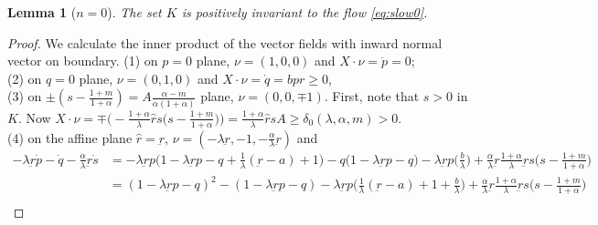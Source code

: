 \documentclass[a4paper,11pt]{article}
\newtheorem{lemma}{Lemma}[section]
\begin{document}
{%
\begin{lemma}[$n=0$] 
The set $K$ is positively invariant to the flow \eqref{eq:slow0}. \label{l:posK0}
\end{lemma}
\begin{proof}
 We calculate the inner product of the vector fields with inward normal vector on boundary.
 (1) on $p=0$ plane, $\nu = (1,0,0)$ and $X\cdot\nu = \dot{p}=0$;\\
 (2) on $q=0$ plane, $\nu = (0,1,0)$ and $X\cdot\nu=\dot{q} = bpr\ge0$,\\
 (3) on $\pm\left(s-\frac{1+m}{1+\alpha}\right) = A \frac{\alpha-m}{\alpha(1+\alpha)}$ plane, $\nu = (0,0,\mp1)$. First, note that $s>0$ in $K$. Now $X\cdot\nu = \mp\Big(-\frac{1+\alpha}{\lambda}\hat{r}s\big(s- \frac{1+m}{1+\alpha}\big)\Big) = \frac{1+\alpha}{\lambda}\hat{r}sA \ge \delta_0(\lambda,\alpha,m)>0$.\\%
 (4) on the affine plane $\hat{r}=\underbar{r}$, $\nu = (-\lambda \underbar{r}, -1,-\frac{\alpha}{\lambda}\underbar{r})$ and 
 \begin{align}
  -\lambda \underbar{r}\dot{p} -\dot{q}-\frac{\alpha}{\lambda}\underbar{r}\dot{s} &= -\lambda \underbar{r}p \Big(1-\lambda \underbar{r}p -q + \frac{1}{\lambda}(\underbar{r}-a)+1\Big) - q(1-\lambda \underbar{r}p -q\big) - \lambda \underbar{r}p\Big(\frac{b}{\lambda}\Big) + \frac{\alpha}{\lambda}\underbar{r}\frac{1+\alpha}{\lambda}\underbar{r}s\big(s- \frac{1+m}{1+\alpha}\big)\nonumber\\
  &= (1-\lambda \underbar{r}p -q)^2 - (1-\lambda \underbar{r}p -q) -\lambda \underbar{r}p\Big(\frac{1}{\lambda}(\underbar{r}-a)+1+\frac{b}{\lambda}\Big) + \frac{\alpha}{\lambda}\underbar{r}\frac{1+\alpha}{\lambda}\underbar{r}s\big(s- \frac{1+m}{1+\alpha}\big)\nonumber\\

\end{align}
\end{proof}}
\end{document}
